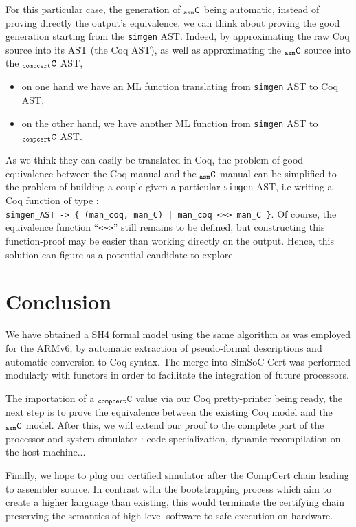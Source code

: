 \documentclass[a4paper, 11pt]{article}
\newcommand{\ccert}{CompCert\xspace}
\newcommand{\simgen}{{\tt simgen}\xspace}
\newcommand{\C}{$_{\tt compcert}{\tt C}$\xspace}
\newcommand{\aC}{$_{\tt asm}{\tt C}$\xspace}
\newcommand{\SScert}{SimSoC-Cert\xspace}
\begin{document}
For this particular case, the generation of \aC being automatic, instead of proving directly the output's equivalence, we can think about proving the good generation starting from the \simgen AST. Indeed, by approximating the raw Coq source into its AST (the Coq AST), as well as approximating the \aC source into the \C AST, 
\begin{itemize}
\item on one hand we have an ML function translating from \simgen AST to Coq AST,
\item on the other hand, we have another ML function from \simgen AST to \C AST.
\end{itemize} 
As we think they can easily be translated in Coq, the problem of good equivalence between the Coq manual and the \aC manual can be simplified to the problem of building a couple given a particular \simgen AST, i.e writing a Coq function of type : \\
\verb!simgen_AST -> { (man_coq, man_C) | man_coq <~> man_C }!. Of course, the equivalence function ``\verb|<~>|'' still remains to be defined, but constructing this function-proof may be easier than working directly on the output. Hence, this solution can figure as a potential candidate to explore.

\section{Conclusion}
\label{s:concl}

We have obtained a SH4 formal model using the same algorithm as was employed for the ARMv6, by automatic extraction of pseudo-formal descriptions and automatic conversion to Coq syntax. The merge into \SScert was performed modularly with functors in order to facilitate the integration of future processors.

The importation of a \C value via our Coq pretty-printer being ready, the next step is to prove the equivalence between the existing Coq model and the \aC model. After this, we will extend our proof to the complete part of the processor and system simulator : code specialization, dynamic recompilation on the host machine...

Finally, we hope to plug our certified simulator after the \ccert chain leading to assembler source. In contrast with the bootstrapping process which aim to create a higher language than existing, this would terminate the certifying chain preserving the semantics of high-level software to safe execution on hardware.
\end{document}
